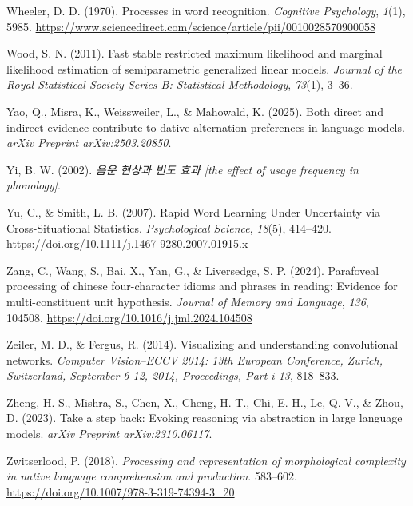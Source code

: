 \documentclass[
  12pt,
  letterpaper,
]{scrreport}
\newlength{\cslhangindent}
\newenvironment{CSLReferences}[2] %
 {\begin{list}{}{%
  \setlength{\itemindent}{0pt}
  \setlength{\leftmargin}{0pt}
  \setlength{\parsep}{0pt}
  \ifodd #1
   \setlength{\leftmargin}{\cslhangindent}
   \setlength{\itemindent}{-1\cslhangindent}
  \fi
  \setlength{\itemsep}{#2\baselineskip}}}
 {\end{list}}
\begin{document}
\begin{CSLReferences}{1}{0}
Wheeler, D. D. (1970). Processes in word recognition. \emph{Cognitive
Psychology}, \emph{1}(1), 5985.
\url{https://www.sciencedirect.com/science/article/pii/0010028570900058}

Wood, S. N. (2011). Fast stable restricted maximum likelihood and
marginal likelihood estimation of semiparametric generalized linear
models. \emph{Journal of the Royal Statistical Society Series B:
Statistical Methodology}, \emph{73}(1), 3--36.

Yao, Q., Misra, K., Weissweiler, L., \& Mahowald, K. (2025). Both direct
and indirect evidence contribute to dative alternation preferences in
language models. \emph{arXiv Preprint arXiv:2503.20850}.

Yi, B. W. (2002). \emph{음운 현상과 빈도 효과 {[}the effect of usage
frequency in phonology{]}}.

Yu, C., \& Smith, L. B. (2007). Rapid Word Learning Under Uncertainty
via Cross-Situational Statistics. \emph{Psychological Science},
\emph{18}(5), 414--420.
\url{https://doi.org/10.1111/j.1467-9280.2007.01915.x}

Zang, C., Wang, S., Bai, X., Yan, G., \& Liversedge, S. P. (2024).
Parafoveal processing of chinese four-character idioms and phrases in
reading: Evidence for multi-constituent unit hypothesis. \emph{Journal
of Memory and Language}, \emph{136}, 104508.
\url{https://doi.org/10.1016/j.jml.2024.104508}

Zeiler, M. D., \& Fergus, R. (2014). Visualizing and understanding
convolutional networks. \emph{Computer Vision--ECCV 2014: 13th European
Conference, Zurich, Switzerland, September 6-12, 2014, Proceedings, Part
i 13}, 818--833.

Zheng, H. S., Mishra, S., Chen, X., Cheng, H.-T., Chi, E. H., Le, Q. V.,
\& Zhou, D. (2023). Take a step back: Evoking reasoning via abstraction
in large language models. \emph{arXiv Preprint arXiv:2310.06117}.

Zwitserlood, P. (2018). \emph{Processing and representation of
morphological complexity in native language comprehension and
production}. 583--602.
\url{https://doi.org/10.1007/978-3-319-74394-3_20}

\end{CSLReferences}
\end{document}
